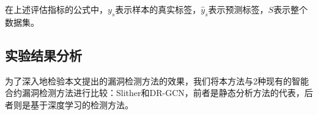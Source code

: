 在上述评估指标的公式中，$y_s$表示样本的真实标签，$\hat{y}_s$表示预测标签，$S$表示整个数据集。


\subsection{实验结果分析}
\label{sec:实验结果分析}
为了深入地检验本文提出的漏洞检测方法的效果，我们将本方法与2种现有的智能合约漏洞检测方法进行比较：Slither\cite{slither}和DR-GCN\cite{liu2021smart}，前者是静态分析方法的代表，后者则是基于深度学习的检测方法。


